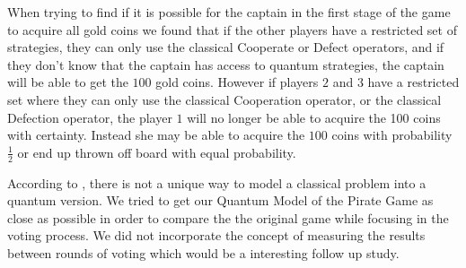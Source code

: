 \documentclass[10pt]{llncs}
\begin{document}
When trying to find if it is possible for the captain in the first stage of the game to acquire all gold coins we found that if the other players have a restricted set of strategies, they can only use the classical Cooperate or Defect operators, and if they don't know that the captain has access to quantum strategies, the captain will be able to get the $100$ gold coins. However if players $2$ and $3$ have a restricted set where they can only use the classical Cooperation operator, or the classical Defection operator, the player $1$ will no longer be able to acquire the 100 coins with certainty. Instead she may be able to acquire the $100$ coins with probability $\frac{1}{2}$ or end up thrown off board with equal probability.

 According to \cite{Gill2002}, there is not a unique way to model a classical problem into a quantum version. We tried to get our Quantum Model of the Pirate Game as close as possible in order to compare the the original game while focusing in the voting process. We did not incorporate the concept of measuring the results between rounds of voting which would be a interesting follow up study. 

 




\end{document}

